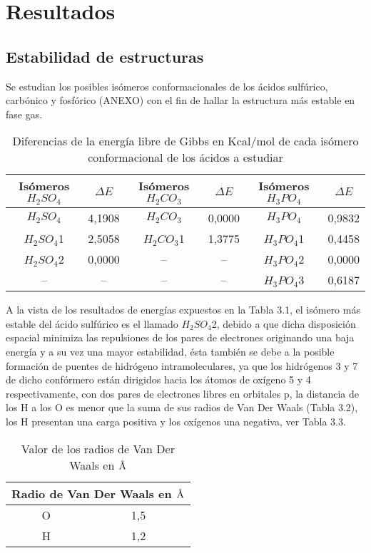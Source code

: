 \chapter{Resultados}

\section{Estabilidad de estructuras}



Se estudian los posibles isómeros conformacionales de los ácidos sulfúrico, carbónico y fosfórico (ANEXO) con el fin de hallar la estructura más estable en fase gas. \\

  \begin{table}[H]
\begin{center}
\begin{tabular}{|c|c|c|c|c|c|}
\hline
Isómeros $H_2SO_4$ & $\Delta E$ & Isómeros $H_2CO_3$ & $\Delta E$ & Isómeros $H_3PO_4$ & $\Delta E$ \\ \hline
$H_2SO_4$ & 4,1908 & $H_2CO_3$ & 0,0000 & $H_3PO_4$ & 0,9832 \\ \hline
$H_2SO_4$1 & 2,5058 & $H_2CO_3$1 & 1,3775 & $H_3PO_4$1 & 0,4458 \\ \hline
$H_2SO_4$2 & 0,0000 & -- & -- & $H_3PO_4$2 & 0,0000 \\ \hline
-- & -- & -- & -- & $H_3PO_4$3 & 0,6187 \\ \hline
\end{tabular}
\caption{Diferencias de la energía libre de Gibbs en Kcal/mol de cada isómero conformacional de los ácidos a estudiar}
\label{tab:3.1}
\end{center}
\end{table}
A la vista de los resultados de energías expuestos en la Tabla 3.1, el isómero más estable del ácido sulfúrico es el llamado $H_2SO_4$2, debido a que dicha disposición espacial minimiza las repulsiones de los pares de electrones originando una baja energía y a su vez una mayor estabilidad, ésta también se debe a la posible formación de puentes de hidrógeno intramoleculares, ya que los hidrógenos 3 y 7 de dicho confórmero están dirigidos hacia los átomos de oxígeno 5 y 4 respectivamente, con dos pares de electrones libres en orbitales p, la distancia de los H a los O es menor que la suma de sus radios de Van Der Waals (Tabla 3.2), los H presentan una carga positiva y los oxígenos una negativa, ver Tabla 3.3.
	\begin{table}[H]
\begin{center}
\begin{tabular}{|c|c|}
	\hline
	\multicolumn{2}{|c|}{Radio de Van Der Waals en $\mbox{\normalfont\AA}$} \\ \hline
	O & 1,5 \\ \hline
	H & 1,2 \\ \hline
\end{tabular}
\caption{Valor de los radios de Van Der Waals en $\mbox{\normalfont\AA}$}
\end{center}	
\end{table}
